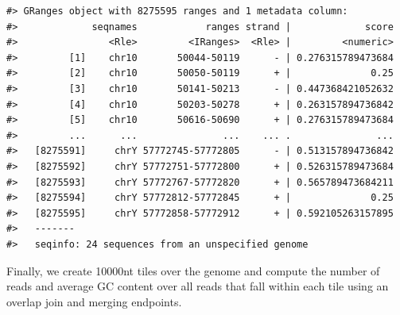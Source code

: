 \documentclass[]{article}
\newenvironment{Shaded}{\begin{snugshade}}{\end{snugshade}}
\newcommand{\KeywordTok}[1]{\textcolor[rgb]{0.13,0.29,0.53}{\textbf{#1}}}
\newcommand{\DataTypeTok}[1]{\textcolor[rgb]{0.13,0.29,0.53}{#1}}
\newcommand{\StringTok}[1]{\textcolor[rgb]{0.31,0.60,0.02}{#1}}
\newcommand{\OperatorTok}[1]{\textcolor[rgb]{0.81,0.36,0.00}{\textbf{#1}}}
\newcommand{\NormalTok}[1]{#1}
\begin{document}
\begin{verbatim}
#> GRanges object with 8275595 ranges and 1 metadata column:
#>             seqnames            ranges strand |             score
#>                <Rle>         <IRanges>  <Rle> |         <numeric>
#>         [1]    chr10       50044-50119      - | 0.276315789473684
#>         [2]    chr10       50050-50119      + |              0.25
#>         [3]    chr10       50141-50213      - | 0.447368421052632
#>         [4]    chr10       50203-50278      + | 0.263157894736842
#>         [5]    chr10       50616-50690      + | 0.276315789473684
#>         ...      ...               ...    ... .               ...
#>   [8275591]     chrY 57772745-57772805      - | 0.513157894736842
#>   [8275592]     chrY 57772751-57772800      + | 0.526315789473684
#>   [8275593]     chrY 57772767-57772820      + | 0.565789473684211
#>   [8275594]     chrY 57772812-57772845      + |              0.25
#>   [8275595]     chrY 57772858-57772912      + | 0.592105263157895
#>   -------
#>   seqinfo: 24 sequences from an unspecified genome
\end{verbatim}

Finally, we create 10000nt tiles over the genome and compute the number
of reads and average GC content over all reads that fall within each
tile using an overlap join and merging endpoints.

\begin{Shaded}
\end{Shaded}
\end{document}
